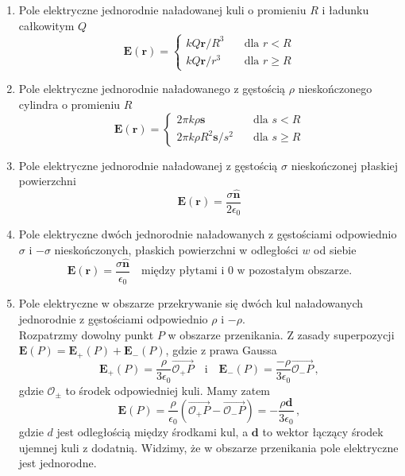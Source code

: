 \documentclass[../main.tex]{subfiles}
\begin{document}
\begin{enumerate}
    \item Pole elektryczne jednorodnie naładowanej kuli o promieniu \(R\) i ładunku całkowitym \(Q\)
    \begin{equation*}
        \mathbf{E}(\mathbf{r})=\begin{cases} kQ\mathbf{r}/R^3\quad&\text{dla \(r<R\)}\\ kQ\mathbf{r}/r^3\quad&\text{dla \(r\geq R\)}\end{cases}
    \end{equation*}
    \item Pole elektryczne jednorodnie naładowanego z gęstością \(\rho\) nieskończonego cylindra o
    promieniu \(R\)
    \begin{equation*}
        \mathbf{E}(\mathbf{r})= \begin{cases} 
        2\pi k \rho\mathbf{s}\quad&\text{dla \(s<R\)}\\
        2\pi k\rho R^2\mathbf{s}/s^2\quad&\text{dla \(s\geq R\)}
        \end{cases}
    \end{equation*}
    \item Pole elektryczne jednorodnie naładowanej z gęstością \(\sigma\) nieskończonej płaskiej
    powierzchni
    \begin{equation*}
        \mathbf{E}(\mathbf{r})=\frac{\sigma \mathbf{\hat{n}}}{2\epsilon_0}
    \end{equation*}
    \item Pole elektryczne dwóch jednorodnie naładowanych z gęstościami odpowiednio \(\sigma\) i
    \(-\sigma\) nieskończonych, płaskich powierzchni w odległości \(w\) od siebie
    \begin{equation*}
        \mathbf{E}(\mathbf{r})=\frac{\sigma \mathbf{\hat{n}}}{\epsilon_0}\quad\text{między płytami i 0 w pozostałym obszarze.}
    \end{equation*}
    
    \item Pole elektryczne w obszarze przekrywanie się dwóch kul naładowanych jednorodnie z
    gęstościami odpowiednio \(\rho\) i \(-\rho\).\\
    Rozpatrzmy dowolny punkt \(P\) w obszarze przenikania. Z zasady superpozycji
    \(\mathbf{E}(P)=\mathbf{E}_+(P)+\mathbf{E}_-(P)\), gdzie z prawa Gaussa
    \begin{equation*}
        \mathbf{E}_+(P)=\frac{\rho}{3\epsilon_0}\overrightarrow{\mathcal{O}_+P}\quad\text{i}\quad\mathbf{E}_-(P)=\frac{-\rho}{3\epsilon_0}\overrightarrow{\mathcal{O}_-P}\,,
    \end{equation*}
    gdzie \(\mathcal{O}_\pm\) to środek odpowiedniej kuli. Mamy zatem
    \begin{equation*}
        \mathbf{E}(P)=\frac{\rho}{\epsilon_0}(\overrightarrow{\mathcal{O}_+P}-\overrightarrow{\mathcal{O}_-P})=-\frac{\rho\mathbf{d}}{3\epsilon_0}\,,
    \end{equation*}
    gdzie \(d\) jest odległością między środkami kul, a \(\mathbf{d}\) to wektor łączący środek
    ujemnej kuli z dodatnią. Widzimy, że w obszarze przenikania pole elektryczne jest jednorodne.
\end{enumerate}
\end{document}
